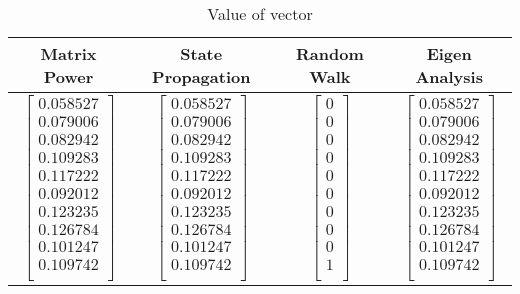 \documentclass[11pt]{article}
\begin{document}
    \begin{table}[!h] 
    \centering
    \label{6E}
    \caption{Value of vector}
    \begin{tabular}{|c|c|c|c|}
      \hline
    Matrix Power & State Propagation & Random Walk & Eigen Analysis  \\
      \hline        
      
$\begin{bmatrix}
   0.058527\\
   0.079006\\
   0.082942\\
   0.109283\\
   0.117222\\
   0.092012\\
   0.123235\\
   0.126784\\
   0.101247\\
   0.109742\\
 \end{bmatrix}$
  &
  $\begin{bmatrix}
   0.058527\\
   0.079006\\
   0.082942\\
   0.109283\\
   0.117222\\
   0.092012\\
   0.123235\\
   0.126784\\
   0.101247\\
   0.109742\\
       \end{bmatrix}$
  &
  $\begin{bmatrix}
   0\\
   0\\
   0\\
   0\\
   0\\
   0\\
   0\\
   0\\
   0\\
   1\\
     \end{bmatrix}$
 &	 
  $\begin{bmatrix}
  0.058527\\
  0.079006\\
  0.082942\\
  0.109283\\
  0.117222\\
  0.092012\\
  0.123235\\
  0.126784\\
  0.101247\\
  0.109742\\
     \end{bmatrix}$\\
      \hline
    \end{tabular}
\end{table}
\end{document}
